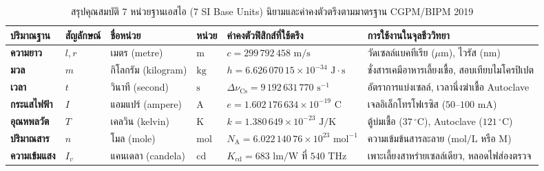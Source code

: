 \begin{table}[htbp]
\centering
\caption{สรุปคุณสมบัติ 7 หน่วยฐานเอสไอ (7 SI Base Units) นิยามและค่าคงตัวตรึงตามมาตรฐาน CGPM/BIPM 2019}
\label{tab:si_base_units}
\footnotesize\setlength{\tabcolsep}{3.5pt}
\renewcommand{\arraystretch}{1.12}
\begin{tabularx}{\textwidth}{>{\bfseries}m{2.2cm} >{\centering\arraybackslash}m{1.2cm} >{\centering\arraybackslash}m{1.8cm} >{\centering\arraybackslash}m{1.1cm} >{\raggedright\arraybackslash}m{3.6cm} >{\raggedright\arraybackslash}X}
\toprule
\textbf{ปริมาณฐาน} & \textbf{สัญลักษณ์} & \textbf{ชื่อหน่วย} & \textbf{หน่วย} & \textbf{ค่าคงตัวฟิสิกส์ที่ใช้ตรึง} & \textbf{การใช้งานในจุลชีววิทยา} \\
\midrule
ความยาว & $l, r$ & เมตร (metre) & $\text{m}$ & $c = 299\,792\,458\text{ m/s}$ & วัดเซลล์แบคทีเรีย ($\mu\text{m}$), ไวรัส ($\text{nm}$) \\
มวล & $m$ & กิโลกรัม (kilogram) & $\text{kg}$ & $h = 6.626\,070\,15 \times 10^{-34}\text{ J}\cdot\text{s}$ & ชั่งสารเคมีอาหารเลี้ยงเชื้อ, สอบเทียบไมโครปิเปต \\
เวลา & $t$ & วินาที (second) & $\text{s}$ & $\Delta\nu_{\text{Cs}} = 9\,192\,631\,770\text{ s}^{-1}$ & อัตราการแบ่งเซลล์, เวลานึ่งฆ่าเชื้อ Autoclave \\
กระแสไฟฟ้า & $I$ & แอมแปร์ (ampere) & $\text{A}$ & $e = 1.602\,176\,634 \times 10^{-19}\text{ C}$ & เจลอิเล็กโทรโฟเรซิส ($50\text{--}100\text{ mA}$) \\
อุณหพลวัต & $T$ & เคลวิน (kelvin) & $\text{K}$ & $k = 1.380\,649 \times 10^{-23}\text{ J/K}$ & ตู้บ่มเชื้อ ($37\,^\circ\text{C}$), Autoclave ($121\,^\circ\text{C}$) \\
ปริมาณสาร & $n$ & โมล (mole) & $\text{mol}$ & $N_{\text{A}} = 6.022\,140\,76 \times 10^{23}\text{ mol}^{-1}$ & ความเข้มข้นสารละลาย ($\text{mol/L}$ หรือ $\text{M}$) \\
ความเข้มแสง & $I_v$ & แคนเดลา (candela) & $\text{cd}$ & $K_{\text{cd}} = 683\text{ lm/W}$ ที่ $540\text{ THz}$ & เพาะเลี้ยงสาหร่ายเซลล์เดียว, หลอดไฟส่องตรวจ \\
\bottomrule
\end{tabularx}
\end{table}


